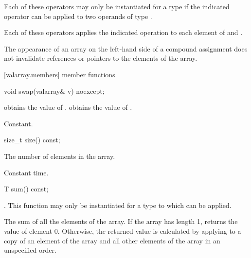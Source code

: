 \begin{itemdescr}
\pnum
\requires
Each of these operators may only be instantiated for a type 
if the indicated operator can be applied to two operands of type .

\pnum
\effects
Each of these operators applies the indicated operation to each element
of  and .

\pnum
\returns
{}

\pnum
\remarks
The appearance of an array on the left-hand side of a compound assignment
does not
invalidate references or pointers to the elements of the array.
\end{itemdescr}

[valarray.members]{ member functions}

%
\begin{itemdecl}
void swap(valarray& v) noexcept;
\end{itemdecl}

\begin{itemdescr}
\pnum
\effects {} obtains the value of
.  obtains the value of .

\pnum
\complexity Constant.
\end{itemdescr}

%
\begin{itemdecl}
size_t size() const;
\end{itemdecl}

\begin{itemdescr}
\pnum
\returns The number of elements in the array.

\pnum
\complexity Constant time.
\end{itemdescr}

%
\begin{itemdecl}
T sum() const;
\end{itemdecl}

\begin{itemdescr}
\pnum
\requires
{}.
This function may only be instantiated for a type  to which
can be applied.

\pnum
\returns
The sum of all the elements of the array.
If the array has length 1, returns the value of element 0.
Otherwise, the returned value is calculated by applying
to a copy of an element of the array and
all other elements of the array in an unspecified order.%
\end{itemdescr}


